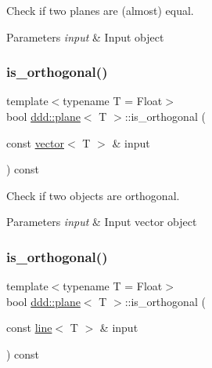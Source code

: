 Check if two planes are (almost) equal. 


\begin{DoxyParams}{Parameters}
{\em input} & Input object \\
\hline
\end{DoxyParams}
\mbox{\label{classddd_1_1plane_a3bea901b743fe8a941b1b6b89ad5f53e}} 
\subsubsection{\texorpdfstring{is\+\_\+orthogonal()}{is\_orthogonal()}\hspace{0.1cm}{\footnotesize\ttfamily [1/5]}}
{\footnotesize\ttfamily template$<$typename T = Float$>$ \\
bool \hyperlink{classddd_1_1plane}{ddd\+::plane}$<$ T $>$\+::is\+\_\+orthogonal (\begin{DoxyParamCaption}\item[{const \hyperlink{classddd_1_1vector}{vector}$<$ T $>$ \&}]{input }\end{DoxyParamCaption}) const\hspace{0.3cm}{\ttfamily [inline]}}



Check if two objects are orthogonal. 


\begin{DoxyParams}{Parameters}
{\em input} & Input vector object \\
\hline
\end{DoxyParams}
\mbox{\label{classddd_1_1plane_a0a9d52d43d074f00cc5f36d85bdc16b1}} 
\subsubsection{\texorpdfstring{is\+\_\+orthogonal()}{is\_orthogonal()}\hspace{0.1cm}{\footnotesize\ttfamily [2/5]}}
{\footnotesize\ttfamily template$<$typename T = Float$>$ \\
bool \hyperlink{classddd_1_1plane}{ddd\+::plane}$<$ T $>$\+::is\+\_\+orthogonal (\begin{DoxyParamCaption}\item[{const \hyperlink{classddd_1_1line}{line}$<$ T $>$ \&}]{input }\end{DoxyParamCaption}) const\hspace{0.3cm}{\ttfamily [inline]}}




